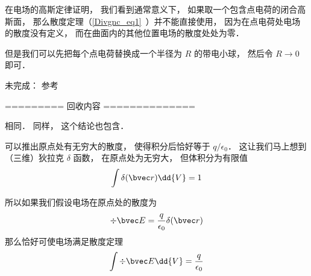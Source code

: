 
\begin{issues}
\issueDraft
\end{issues}


在电场的高斯定律证明， 我们看到通常意义下， 如果取一个包含点电荷的闭合高斯面， 那么散度定理（\autoref{Divgnc_eq1}~）并不能直接使用， 因为在点电荷处电场的散度没有定义， 而在曲面内的其他位置电场的散度处处为零．

但是我们可以先把每个点电荷替换成一个半径为 $R$ 的带电小球， 然后令 $R\to 0$ 即可．




未完成： 参考 \cite{GriffE}

========= 回收内容 ==============

相同． 同样， 这个结论也包含．

可以推出原点处有无穷大的散度， 使得积分后恰好等于 $q/\epsilon_0$． 这让我们马上想到（三维）狄拉克 $\delta$ 函数， 在原点处为无穷大， 但体积分为有限值
\begin{equation}
\int \delta(\bvec r)\dd{V} = 1
\end{equation}

所以如果我们假设电场在原点处的散度为
\begin{equation}
\div \bvec E = \frac{q}{\epsilon_0}\delta(\bvec r)
\end{equation}
那么恰好可使电场满足散度定理
\begin{equation}
\int \div \bvec E \dd{V} = \frac{q}{\epsilon_0}
\end{equation}
